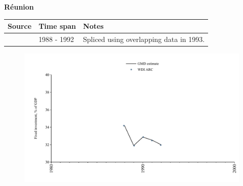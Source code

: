 \documentclass[12pt,a4paper,landscape]{article}
\begin{document}
\begin{adjustbox}{max totalsize={\paperwidth}{\paperheight},center}
\begin{minipage}[t][\textheight][t]{\textwidth}
\vspace*{0.5cm}
{}
\begin{center}
{\Large\bfseries Réunion}
\end{center}
\vspace{0.5cm}
\begin{table}[H]
\centering
\small
\begin{tabular}{|l|l|l|}
\hline
\textbf{Source} & \textbf{Time span} & \textbf{Notes} \\
\hline
\rowcolor{white}\cite{WDI_ARC}& 1988 - 1992 &Spliced using overlapping data in 1993.\\
\hline
\end{tabular}
\end{table}
\begin{figure}[H]
\centering
\includegraphics[width=\textwidth,height=0.6\textheight,keepaspectratio]{graphs/REU_finv_GDP.pdf}
\end{figure}
\end{minipage}
\end{adjustbox}
\end{document}
